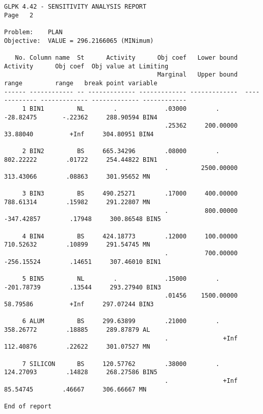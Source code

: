 \newpage

\begin{landscape}
\begin{footnotesize}
\begin{verbatim}
GLPK 4.42 - SENSITIVITY ANALYSIS REPORT                                                                         Page   2

Problem:    PLAN
Objective:  VALUE = 296.2166065 (MINimum)

   No. Column name  St      Activity      Obj coef   Lower bound       Activity      Obj coef  Obj value at Limiting
                                          Marginal   Upper bound          range         range   break point variable
------ ------------ -- ------------- ------------- -------------  ------------- ------------- ------------- ------------
     1 BIN1         NL        .             .03000        .           -28.82475       -.22362     288.90594 BIN4
                                            .25362     200.00000       33.88040          +Inf     304.80951 BIN4

     2 BIN2         BS     665.34296        .08000        .           802.22222        .01722     254.44822 BIN1
                                            .         2500.00000      313.43066        .08863     301.95652 MN

     3 BIN3         BS     490.25271        .17000     400.00000      788.61314        .15982     291.22807 MN
                                            .          800.00000     -347.42857        .17948     300.86548 BIN5

     4 BIN4         BS     424.18773        .12000     100.00000      710.52632        .10899     291.54745 MN
                                            .          700.00000     -256.15524        .14651     307.46010 BIN1

     5 BIN5         NL        .             .15000        .          -201.78739        .13544     293.27940 BIN3
                                            .01456    1500.00000       58.79586          +Inf     297.07244 BIN3

     6 ALUM         BS     299.63899        .21000        .           358.26772        .18885     289.87879 AL
                                            .               +Inf      112.40876        .22622     301.07527 MN

     7 SILICON      BS     120.57762        .38000        .           124.27093        .14828     268.27586 BIN5
                                            .               +Inf       85.54745        .46667     306.66667 MN

End of report
\end{verbatim}
\end{footnotesize}
\end{landscape}

